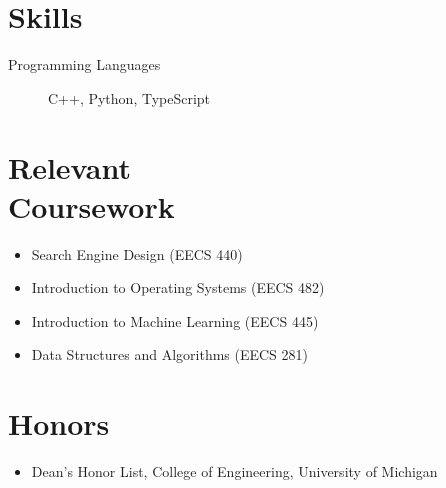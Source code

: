 \documentclass{mycv}
\begin{document}
\section{Skills}

\begin{description}
  \item[Programming Languages] C++, Python, TypeScript
\end{description}

\section{Relevant\\Coursework}
\begin{itemize}
  \item Search Engine Design (EECS 440)
  \item Introduction to Operating Systems (EECS 482)
  \item Introduction to Machine Learning (EECS 445)
  \item Data Structures and Algorithms (EECS 281)
\end{itemize}

\section{Honors}
\begin{itemize}
  \item Dean's Honor List, College of Engineering, University of Michigan
\end{itemize}
\end{document}
